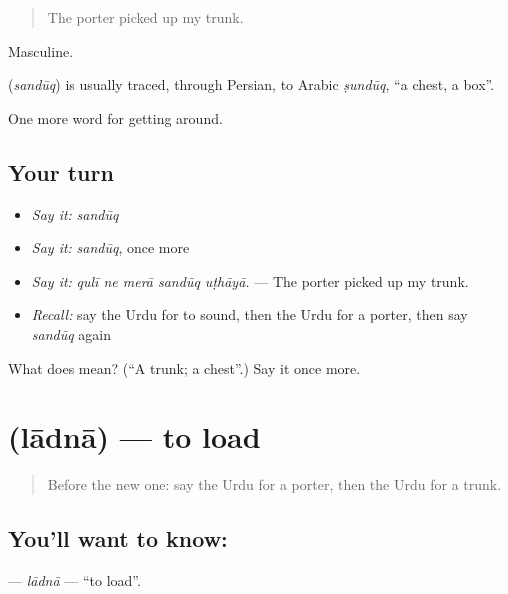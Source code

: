 \begin{quote}
The porter picked up my trunk.
\end{quote}

Masculine.

\begin{cousinweb}
\textbf{} (\emph{sandūq}) is usually traced, through Persian, to Arabic \emph{ṣundūq}, \textquotedblleft{}a chest, a box\textquotedblright{}.
\end{cousinweb}

\begin{grammarlens}[title={What you've built}]
One more word for getting around.
\end{grammarlens}

\subsection*{Your turn}
\begin{itemize}
\raggedright
  \item \emph{Say it:} \emph{sandūq}
  \item \emph{Say it:} \emph{sandūq}, once more
  \item \emph{Say it:} \emph{qulī ne merā sandūq uṭhāyā.} — The porter picked up my trunk.
  \item \emph{Recall:} say the Urdu for to sound, then the Urdu for a porter, then say \emph{sandūq} again
\end{itemize}

\begin{tcolorbox}[breakable,colback=teal!4,colframe=teal!35!black,title={Before you move on}]
What does  mean? (\textquotedblleft{}A trunk; a chest\textquotedblright{}.) Say it once more.
\end{tcolorbox}
\section[\texorpdfstring{\ur{لادنا} (lādnā)}{لادنا (lādnā)}]{ (lādnā) — to load}

\label{lesson:UR-C387-ladna}



\begin{quote}
Before the new one: say the Urdu for a porter, then the Urdu for a trunk.
\end{quote}

\subsection*{You'll want to know: }
\textbf{} — \emph{lādnā} — \textquotedblleft{}to load\textquotedblright{}.

